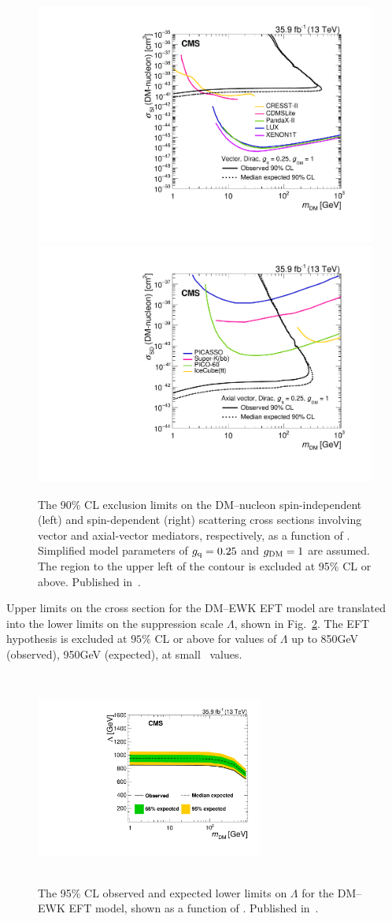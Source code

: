\begin{figure}[htbp]
  \begin{center}
    \includegraphics[width=0.48\linewidth]{figures/exo16053/Figure_008-a.pdf}
    \includegraphics[width=0.48\linewidth]{figures/exo16053/Figure_008-b.pdf}
    \caption{
      The 90\% CL exclusion limits on the DM--nucleon spin-independent (left)
      and spin-dependent (right) scattering cross sections involving vector and axial-vector mediators, respectively,
      as a function of \mdm. Simplified model parameters of $g_\mathrm{q}=0.25$ and $g_\mathrm{DM}=1$ are assumed.
      The region to the upper left of the contour is excluded at 95\% CL or above. Published in~\cite{ref:JHEP02(2019)074}.
    }
    \label{fig:2d_mx}
  \end{center}
\end{figure}

Upper limits on the cross section for the DM--EWK EFT model are translated into the lower limits on the suppression scale $\Lambda$, shown in
Fig.~\ref{fig:DMEWKlimits}. The EFT hypothesis is excluded at $95\%$ CL or above for values of $\Lambda$ up to 850\unit{GeV} (observed), 950\unit{GeV}
(expected), at small \mdm\ values.

\begin{figure}[htbp]
\begin{center}
\includegraphics[width=7.5cm,height=7.0cm]{figures/exo16053/Figure_009.pdf}
\caption{The 95\% CL observed and expected lower limits on $\Lambda$ for the DM--EWK EFT model, shown as a function of \mdm.
Published in~\cite{ref:JHEP02(2019)074}.}
\label{fig:DMEWKlimits}
\end{center}
\end{figure}

